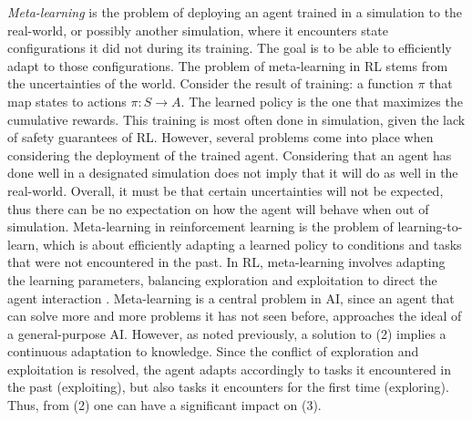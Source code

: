 \emph{Meta-learning} is the problem of deploying an agent trained in a simulation to
the real-world, or possibly another simulation, where it encounters
state configurations it did not during its training. The goal is to
be able to efficiently adapt to those configurations. The problem of meta-learning in RL stems from the uncertainties of the world. 
Consider the result of training: a function $\pi$ that map states to
actions $\pi : S \rightarrow A$. The learned policy is the one that maximizes the cumulative rewards.
This training is most often done in simulation, given the lack of safety guarantees of RL. 
However, several problems come into place when considering the deployment of the trained agent. Considering that an agent has done well in 
a designated simulation does not imply that it will do as well in the real-world. Overall, it must be that certain uncertainties will not be expected, thus there can be no expectation on how the agent will behave 
when out of simulation. Meta-learning in reinforcement learning is the problem of learning-to-learn, which is about efficiently
adapting a learned policy to conditions and tasks that were not encountered in the past. In RL, meta-learning
involves adapting the learning parameters, balancing exploration and exploitation to direct the
agent interaction \cite{gupta_meta-reinforcement_2018,schweighofer_meta-learning_2003}. Meta-learning is a central problem in AI, since an agent that can solve more
and more problems it has not seen before, approaches the ideal of a general-purpose AI. However, as noted previously, a solution to (2) implies 
a continuous adaptation to knowledge. Since the conflict of exploration and exploitation is resolved, the agent adapts accordingly to tasks it encountered in the past (exploiting), but also 
tasks it encounters for the first time (exploring). Thus, from (2) one
can have a significant impact on (3).
